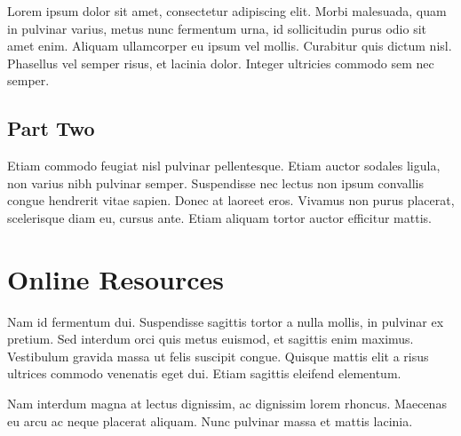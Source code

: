 Lorem ipsum dolor sit amet, consectetur adipiscing elit. Morbi
malesuada, quam in pulvinar varius, metus nunc fermentum urna, id
sollicitudin purus odio sit amet enim. Aliquam ullamcorper eu ipsum
vel mollis. Curabitur quis dictum nisl. Phasellus vel semper risus, et
lacinia dolor. Integer ultricies commodo sem nec semper.

\subsection{Part Two}

Etiam commodo feugiat nisl pulvinar pellentesque. Etiam auctor sodales
ligula, non varius nibh pulvinar semper. Suspendisse nec lectus non
ipsum convallis congue hendrerit vitae sapien. Donec at laoreet
eros. Vivamus non purus placerat, scelerisque diam eu, cursus
ante. Etiam aliquam tortor auctor efficitur mattis.

\section{Online Resources}

Nam id fermentum dui. Suspendisse sagittis tortor a nulla mollis, in
pulvinar ex pretium. Sed interdum orci quis metus euismod, et sagittis
enim maximus. Vestibulum gravida massa ut felis suscipit
congue. Quisque mattis elit a risus ultrices commodo venenatis eget
dui. Etiam sagittis eleifend elementum.

Nam interdum magna at lectus dignissim, ac dignissim lorem
rhoncus. Maecenas eu arcu ac neque placerat aliquam. Nunc pulvinar
massa et mattis lacinia.


\endinput

\message{ !name(b2bdatalog.tex) !offset(-1206) }
